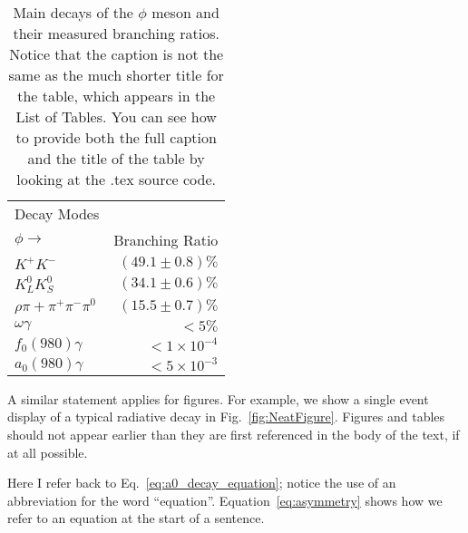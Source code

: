 \documentclass[12pt]{report}
\begin{document}
\begin{table}[!thb]
\begin{center}
\begin{tabular}{|l|r|}
\hline
Decay Modes &\\ $\phi \rightarrow$ & Branching Ratio \\ \hline\hline
$K^+K^-$ & $(49.1\pm 0.8)\%$ \\ \hline
$K_{L}^{0}K_{S}^{0}$ & $(34.1\pm 0.6)\%$ \\ \hline
$\rho \pi + \pi^+ \pi^- \pi^0$ & $(15.5\pm 0.7)\%$ \\ \hline
$\omega \gamma$ & $<5\%$ \\ \hline
$f_0(980)\gamma$ & $<1\times 10^{-4}$ \\ \hline
$a_0(980)\gamma$ & $<5\times 10^{-3}$ \\ \hline
\end{tabular}
\end{center}
\caption[Main decays of the $\phi$ meson.] %
        {Main decays of the $\phi$ meson and their measured branching ratios. Notice that the caption is
        not the same as the much shorter title for the table, which appears in the List of Tables. You can see how to provide both the full caption and the title of the table by looking at the .tex source code.} %
\label{tab:phidecays} %
\end{table}


A similar statement applies for figures. For example, we show a single event display of
a typical radiative decay in Fig.~\ref{fig:NeatFigure}. Figures and tables should not appear
earlier than they are first referenced in the body of the text, if at all possible.

Here I refer back to Eq.~\ref{eq:a0_decay_equation}; notice the use of
an abbreviation for the word ``equation''. Equation~\ref{eq:asymmetry} shows
how we refer to an equation at the start of a sentence.


\begin{figure*}[!tb]
\begin{center}
\end{center}
\caption[A neat figure] %
{\label{fig:NeatFigure} %
  This is a very nifty figure, which should be described in detail in this caption. Remember to
  describe all relevant aspects: what is plotted against what, if it is a graph, what the relevant features and
  symbols are, {\em etc.} . Your reader should be able to read the caption and understand everything of relevance in the figure. Figure captions should be in
  complete, properly punctuated sentences.
}
\end{figure*}
\end{document}
